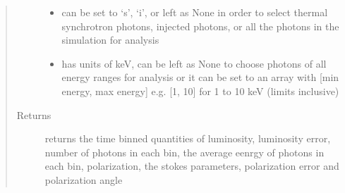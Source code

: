 \documentclass[letterpaper,10pt,english]{sphinxmanual}
\begin{document}
\begin{fulllineitems}
\begin{quote}
\begin{description}
\begin{itemize}
\item {} 
 \textendash{} can be set to ‘s’, ‘i’, or left as None in order to select thermal synchrotron photons, injected photons, or all the photons in the simulation for analysis

\item {} 
 \textendash{} has units of keV, can be left as None to choose photons of all energy ranges for analysis or it can be set to an array with {[}min energy, max energy{]} e.g. {[}1, 10{]} for 1 to 10 keV (limits inclusive)

\end{itemize}

\item[{Returns}] \leavevmode
returns the time binned quantities of luminosity, luminosity error, number of photons in each bin, the
average eenrgy of photons in each bin, polarization, the stokes parameters, polarization error and
polarization angle

\end{description}\end{quote}

\end{fulllineitems}

\end{document}
